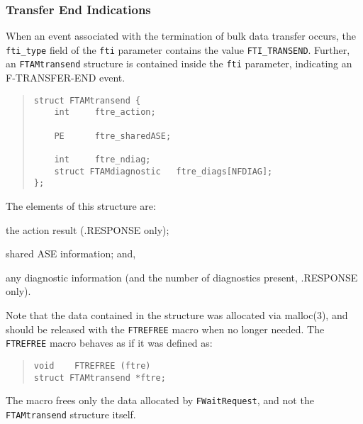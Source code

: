 \subsubsection	{Transfer End Indications}
When an event associated with the termination of bulk data transfer occurs,
the \verb"fti_type" field of the \verb"fti" parameter contains the value
\verb"FTI_TRANSEND".
Further,
an \verb"FTAMtransend" structure is contained inside the \verb"fti" parameter,
indicating an {\sf F-TRANSFER-END\/} event.
\begin{quote}\small\begin{verbatim}
struct FTAMtransend {
    int     ftre_action;

    PE      ftre_sharedASE;

    int     ftre_ndiag;
    struct FTAMdiagnostic   ftre_diags[NFDIAG];
};
\end{verbatim}\end{quote}
The elements of this structure are:
\begin{describe}
\item[\verb"ftre\_action":] the action result ({\sf .RESPONSE\/} only);

\item[\verb"ftre\_sharedASE":] shared ASE information;
and,

\item[\verb"ftre\_diags"/\verb"ftre\_ndiag":] any diagnostic information
(and the number of diagnostics present, {\sf .RESPONSE\/} only).
\end{describe}
Note that the data contained in the structure was allocated via \man malloc(3),
and should be released with the \verb"FTREFREE" macro when no longer needed.
The \verb"FTREFREE" macro
behaves as if it was defined as:
\begin{quote}\small\begin{verbatim}
void    FTREFREE (ftre)
struct FTAMtransend *ftre;
\end{verbatim}\end{quote}
The macro frees only the data allocated by \verb"FWaitRequest",
and not the \verb"FTAMtransend" structure itself.


